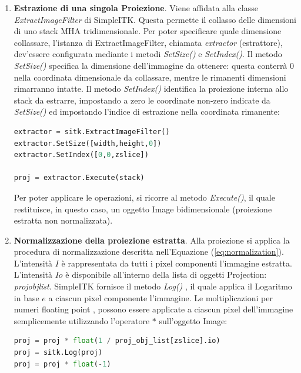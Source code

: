 \documentclass[a4paper,12pt, doubleside]{report}
\begin{document}
                \begin{enumerate}
                    \item \textbf{Estrazione di una singola Proiezione}. Viene affidata alla classe \textit{ExtractImageFilter} \cite{sitk-estractor} di SimpleITK. Questa permette il collasso delle dimensioni di uno stack MHA tridimensionale. Per poter specificare quale dimensione collassare, l'istanza di ExtractImageFilter, chiamata \textit{extractor} (estrattore), dev'essere configurata mediante i metodi \textit{SetSize()} e \textit{SetIndex()}. Il metodo \textit{SetSize()} specifica la dimensione dell'immagine da ottenere: questa conterrà $0$ nella coordinata dimensionale da collassare, mentre le rimanenti dimensioni rimarranno intatte. Il metodo \textit{SetIndex()} identifica la proiezione interna allo stack da estrarre, impostando a zero le coordinate non-zero indicate da \textit{SetSize()} ed impostando l'indice di estrazione nella coordinata rimanente:
                    
                    \begin{lstlisting}[language=python, frame=bt]
extractor = sitk.ExtractImageFilter()
extractor.SetSize([width,height,0])
extractor.SetIndex([0,0,zslice])

proj = extractor.Execute(stack)
                    \end{lstlisting} 
                    
                    Per poter applicare le operazioni, si ricorre al metodo \textit{Execute()}, il quale restituisce, in questo caso, un oggetto Image bidimensionale (proiezione estratta non normalizzata).
                    
                    \item \textbf{Normalizzazione della proiezione estratta}. Alla proiezione si applica la procedura di normalizzazione descritta nell'Equazione (\ref{eq:normalization}). L'intensità $I$ è rappresentata da tutti i pixel componenti l'immagine estratta. L'intensità $Io$ è disponibile all'interno della lista di oggetti Projection: \textit{proj\textunderscore obj\textunderscore list}. SimpleITK fornisce il metodo \textit{Log()} \cite{sitk-log}, il quale applica il Logaritmo in base $e$ a ciascun pixel componente l'immagine. 
                    Le moltiplicazioni per numeri floating point \cite{python-floating-point}, possono essere applicate a ciascun pixel dell'immagine semplicemente utilizzando l'operatore $*$ \cite{sitk-star-operator} sull'oggetto Image:
                    \begin{lstlisting}[language=python, frame=bt]
proj = proj * float(1 / proj_obj_list[zslice].io)
proj = sitk.Log(proj)
proj = proj * float(-1)
                    \end{lstlisting}
                    

\end{enumerate}
\end{document}
